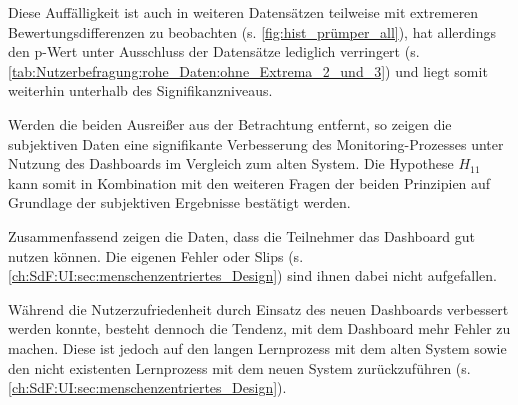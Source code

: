 Diese Auffälligkeit ist auch in weiteren Datensätzen teilweise mit extremeren Bewertungsdifferenzen zu beobachten (s. \autoref{fig:hist_prümper_all}), hat allerdings den p-Wert unter Ausschluss der Datensätze lediglich verringert (s. \autoref{tab:Nutzerbefragung:rohe_Daten:ohne_Extrema_2_und_3}) und liegt somit weiterhin unterhalb des Signifikanzniveaus.

Werden die beiden Ausreißer aus der Betrachtung entfernt, so zeigen die subjektiven Daten eine signifikante Verbesserung des Monitoring-Prozesses unter Nutzung des Dash\-boards im Vergleich zum alten System. Die Hypothese $H_{11}$ kann somit in Kombination mit den weiteren Fragen der beiden Prinzipien auf Grundlage der subjektiven Ergebnisse bestätigt werden.

Zusammenfassend zeigen die Daten, dass die Teilnehmer das Dash\-board gut nutzen können. Die eigenen Fehler oder Slips (s. \autoref{ch:SdF:UI:sec:menschenzentriertes_Design}) sind ihnen dabei nicht aufgefallen.

Während die Nutzerzufriedenheit durch Einsatz des neuen Dash\-boards verbessert werden konnte, besteht dennoch die Tendenz, mit dem Dash\-board mehr Fehler zu machen. Diese ist jedoch auf den langen Lernprozess mit dem alten System sowie den nicht existenten Lernprozess mit dem neuen System zurückzuführen (s. \autoref{ch:SdF:UI:sec:menschenzentriertes_Design}).

